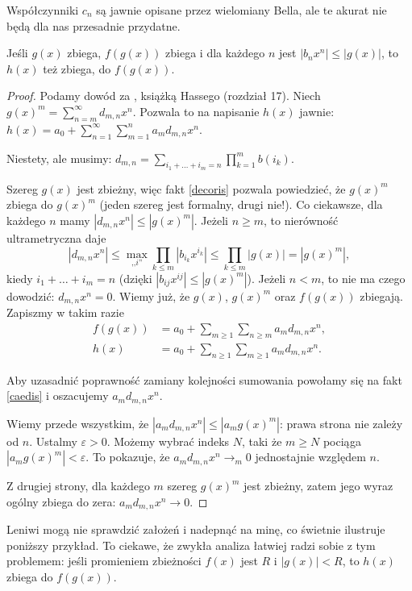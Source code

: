 Współczynniki $c_n$ są jawnie opisane przez wielomiany Bella, ale te akurat nie będą dla nas przesadnie przydatne.

\begin{fakt}[złoty] \label{auctoris}
	Jeśli $g(x)$ zbiega, $f(g(x))$ zbiega i dla każdego $n$ jest $|b_n x^n| \le |g(x)|$, to $h(x)$ też zbiega, do $f(g(x))$.
\end{fakt}

\begin{proof}
	Podamy dowód za \cite{hasse80}, książką Hassego (rozdział 17).
	Niech $g(x)^m = \sum_{n = m}^\infty d_{m, n} x^n$.
	Pozwala to na napisanie $h(x)$ jawnie: $h(x) = a_0 + \sum_{n = 1}^\infty \sum_{m = 1}^n a_m d_{m, n} x^n$.

	Niestety, ale musimy: $d_{m, n} = \sum_{i_1 + \ldots + i_m = n} \prod_{k = 1}^m b(i_k)$.

	Szereg $g(x)$ jest zbieżny, więc fakt  \ref{decoris} pozwala powiedzieć, że $g(x)^m$ zbiega do $g(x)^m$ (jeden szereg jest formalny, drugi nie!).
	Co ciekawsze, dla każdego $n$ mamy $|d_{m,n}x^n| \le |g(x)^m|$.
	Jeżeli $n \ge m$, to nierówność ultrametryczna daje
	\[
		|d_{m,n}x^n| \le \max_{\mbox{,,}i\mbox{''}} \prod_{k \le m} |b_{i_k} x^{i_k}| \le \prod_{k \le m} |g(x)| = |g(x)^m|,
	\]
	kiedy $i_1 + \ldots + i_m = n$ (dzięki $|b_{ij} x^{ij}| \le |g(x)^m|$).
	Jeżeli $n < m$, to nie ma czego dowodzić: $d_{m,n}x^n = 0$.
	Wiemy już, że $g(x)$, $g(x)^m$ oraz $f(g(x))$ zbiegają.
	Zapiszmy w takim razie
	\begin{align*}
	 	f(g(x))	& = a_0 + \sum_{m \ge 1} \sum_{n \ge m} a_m d_{m,n}x^n,\\
		h(x) & = a_0 + \sum_{n \ge 1} \sum_{m \ge 1} a_md_{m,n} x^n.
	\end{align*}

	Aby uzasadnić poprawność zamiany kolejności sumowania powołamy się na fakt \ref{caedis} i oszacujemy $a_md_{m,n}x^n$.

	Wiemy przede wszystkim, że $|a_md_{m,n}x^n| \le |a_mg(x)^m|$: prawa strona nie zależy od $n$.
	Ustalmy $\varepsilon > 0$.
	Możemy wybrać indeks $N$, taki że $m \ge N$ pociąga $|a_mg(x)^m| < \varepsilon$.
	To pokazuje, że $a_md_{m,n}x^n \to_m 0$ jednostajnie względem $n$.

	Z drugiej strony, dla każdego $m$ szereg $g(x)^m$ jest zbieżny, zatem jego wyraz ogólny zbiega do zera: $a_m d_{m,n}x^n \to 0$.
\end{proof}

Leniwi mogą nie sprawdzić założeń i nadepnąć na minę, co świetnie ilustruje poniższy przykład.
To ciekawe, że zwykła analiza łatwiej radzi sobie z tym problemem: jeśli promieniem zbieżności $f(x)$ jest $R $ i $|g(x)| < R $, to $h(x)$ zbiega do $f(g(x))$.

